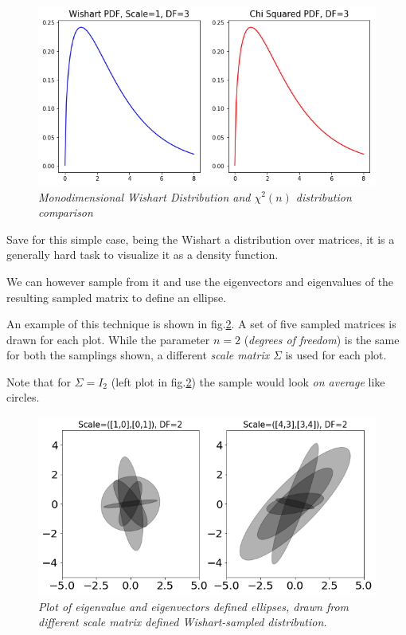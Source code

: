 \documentclass[12pt,openright,twoside,a4paper]{book}
\begin{document}
\begin{figure}[!h]
\centering
\includegraphics[scale=0.37]{wish-chi}
\caption{\textit{Monodimensional Wishart Distribution and $\chi^2(n)$ distribution comparison}}
\label{Wish-chi2}
\end{figure}

Save for this simple case, being the Wishart a distribution over matrices, it is a generally hard task to visualize it as a density function.

We can however sample from it and use the eigenvectors and eigenvalues of the resulting sampled matrix to define an ellipse.

An example of this technique is shown in fig.\ref{Wish-eig}. A set of five sampled matrices is drawn for each plot. While the parameter $n=2$ (\textit{degrees of freedom}) is the same for both the samplings shown, a different \textit{scale matrix} $\Sigma$ is used for each plot.

Note that for $\Sigma=I_2$ (left plot in fig.\ref{Wish-eig}) the sample would look \textit{on average} like circles.

\begin{figure}[!h]
\centering
\includegraphics[scale=0.37]{wisheig-df2}
\caption{\textit{Plot of eigenvalue and eigenvectors defined ellipses, drawn from different scale matrix defined Wishart-sampled distribution. }}
\label{Wish-eig}
\end{figure}
\end{document}
